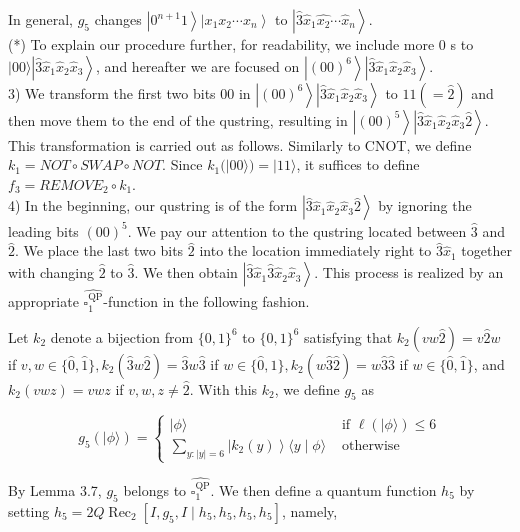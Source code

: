 \documentclass[10pt]{article}
\begin{document}
In general, $g_{5}$ changes $\left|0^{n+1} 1\right\rangle\left|x_{1} x_{2} \cdots x_{n}\right\rangle$ to $\left|\hat{3} \hat{x}_{1} \hat{x_{2}} \cdots \hat{x}_{n}\right\rangle$.\\
(*) To explain our procedure further, for readability, we include more 0 s to $|00\rangle\left|\hat{3} \hat{x}_{1} \hat{x}_{2} \hat{x}_{3}\right\rangle$, and hereafter we are focused on $\left|(00)^{6}\right\rangle\left|\hat{3} \hat{x}_{1} \hat{x}_{2} \hat{x}_{3}\right\rangle$.\\
3) We transform the first two bits 00 in $\left|(00)^{6}\right\rangle\left|\hat{3} \hat{x}_{1} \hat{x}_{2} \hat{x}_{3}\right\rangle$ to $11(=\hat{2})$ and then move them to the end of the qustring, resulting in $\left|(00)^{5}\right\rangle\left|\hat{3} \hat{x}_{1} \hat{x}_{2} \hat{x}_{3} \hat{2}\right\rangle$. This transformation is carried out as follows. Similarly to CNOT, we define $k_{1}=N O T \circ S W A P \circ N O T$. Since $k_{1}(|00\rangle)=|11\rangle$, it suffices to define $f_{3}=R E M O V E_{2} \circ k_{1}$.\\
4) In the beginning, our qustring is of the form $\left|\hat{3} \hat{x}_{1} \hat{x}_{2} \hat{x}_{3} \hat{2}\right\rangle$ by ignoring the leading bits $(00)^{5}$. We pay our attention to the qustring located between $\hat{3}$ and $\hat{2}$. We place the last two bits $\hat{2}$ into the location immediately right to $\hat{3} \hat{x}_{1}$ together with changing $\hat{2}$ to $\hat{3}$. We then obtain $\left|\hat{3} \hat{x}_{1} \hat{3} \hat{x}_{2} \hat{x}_{3}\right\rangle$. This process is realized by an appropriate $\widehat{\square_{1}^{\mathrm{QP}}}$-function in the following fashion.

Let $k_{2}$ denote a bijection from $\{0,1\}^{6}$ to $\{0,1\}^{6}$ satisfying that $k_{2}(v w \hat{2})=v \hat{2} w$ if $v, w \in\{\hat{0}, \hat{1}\}, k_{2}(\hat{3} w \hat{2})= \hat{3} w \hat{3}$ if $w \in\{\hat{0}, \hat{1}\}, k_{2}(w \hat{3} \hat{2})=w \hat{3} \hat{3}$ if $w \in\{\hat{0}, \hat{1}\}$, and $k_{2}(v w z)=v w z$ if $v, w, z \neq \hat{2}$. With this $k_{2}$, we define $g_{5}$ as

$$
g_{5}(|\phi\rangle)= \begin{cases}|\phi\rangle & \text { if } \ell(|\phi\rangle) \leq 6 \\ \sum_{y:|y|=6}\left|k_{2}(y)\right\rangle\langle y \mid \phi\rangle & \text { otherwise }\end{cases}
$$

By Lemma 3.7, $g_{5}$ belongs to $\widehat{\square_{1}^{\mathrm{QP}}}$. We then define a quantum function $h_{5}$ by setting $h_{5}= 2 Q \operatorname{Rec}_{2}\left[I, g_{5}, I \mid h_{5}, h_{5}, h_{5}, h_{5}\right]$, namely,
\end{document}
